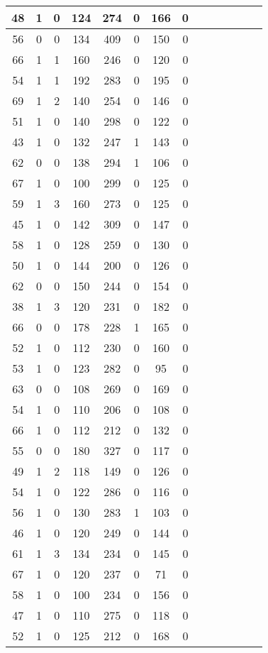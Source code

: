 \documentclass{article}
\begin{document}
\begin{longtable}{|c|c|c|c|c|c|c|c|c|c|c|c|c|c|}
\hline
48 & 1 & 0 & 124 & 274 & 0 & 166 & 0\\
\hline
56 & 0 & 0 & 134 & 409 & 0 & 150 & 0\\
\hline
66 & 1 & 1 & 160 & 246 & 0 & 120 & 0\\
\hline
54 & 1 & 1 & 192 & 283 & 0 & 195 & 0\\
\hline
69 & 1 & 2 & 140 & 254 & 0 & 146 & 0\\
\hline
51 & 1 & 0 & 140 & 298 & 0 & 122 & 0\\
\hline
43 & 1 & 0 & 132 & 247 & 1 & 143 & 0\\
\hline
62 & 0 & 0 & 138 & 294 & 1 & 106 & 0\\
\hline
67 & 1 & 0 & 100 & 299 & 0 & 125 & 0\\
\hline
59 & 1 & 3 & 160 & 273 & 0 & 125 & 0\\
\hline
45 & 1 & 0 & 142 & 309 & 0 & 147 & 0\\
\hline
58 & 1 & 0 & 128 & 259 & 0 & 130 & 0\\
\hline
50 & 1 & 0 & 144 & 200 & 0 & 126 & 0\\
\hline
62 & 0 & 0 & 150 & 244 & 0 & 154 & 0\\
\hline
38 & 1 & 3 & 120 & 231 & 0 & 182 & 0\\
\hline
66 & 0 & 0 & 178 & 228 & 1 & 165 & 0\\
\hline
52 & 1 & 0 & 112 & 230 & 0 & 160 & 0\\
\hline
53 & 1 & 0 & 123 & 282 & 0 & 95 & 0\\
\hline
63 & 0 & 0 & 108 & 269 & 0 & 169 & 0\\
\hline
54 & 1 & 0 & 110 & 206 & 0 & 108 & 0\\
\hline
66 & 1 & 0 & 112 & 212 & 0 & 132 & 0\\
\hline
55 & 0 & 0 & 180 & 327 & 0 & 117 & 0\\
\hline
49 & 1 & 2 & 118 & 149 & 0 & 126 & 0\\
\hline
54 & 1 & 0 & 122 & 286 & 0 & 116 & 0\\
\hline
56 & 1 & 0 & 130 & 283 & 1 & 103 & 0\\
\hline
46 & 1 & 0 & 120 & 249 & 0 & 144 & 0\\
\hline
61 & 1 & 3 & 134 & 234 & 0 & 145 & 0\\
\hline
67 & 1 & 0 & 120 & 237 & 0 & 71 & 0\\
\hline
58 & 1 & 0 & 100 & 234 & 0 & 156 & 0\\
\hline
47 & 1 & 0 & 110 & 275 & 0 & 118 & 0\\
\hline
52 & 1 & 0 & 125 & 212 & 0 & 168 & 0\\

\end{longtable}
\end{document}
